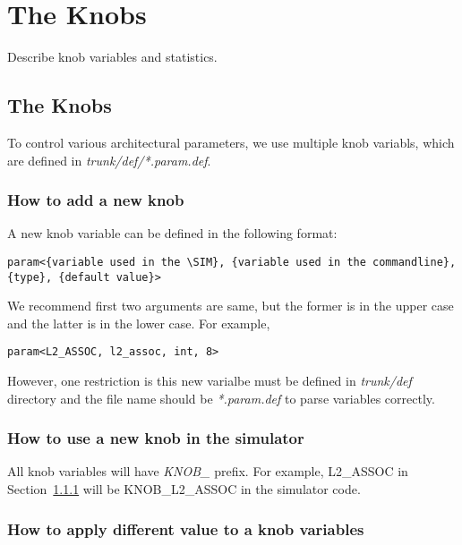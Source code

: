 
\clearpage
\section{The Knobs}


Describe knob variables and statistics.



\subsection{The Knobs}
\label{sec:knob}

To control various architectural parameters, we use multiple knob
variabls, which are defined in \textit{trunk/def/*.param.def}.

\subsubsection{How to add a new knob}
\label{sec:knob1}

A new knob variable can be defined in the following format:

\smallskip
\begin{lstlisting}
param<{variable used in the \SIM}, {variable used in the commandline}, {type}, {default value}>
\end{lstlisting}
\smallskip

We recommend first two arguments are same, but the former is in the
upper case and the latter is in the lower case. For example,

\smallskip
\begin{lstlisting}
param<L2_ASSOC, l2_assoc, int, 8>
\end{lstlisting}
\smallskip


However, one restriction is this new varialbe must be defined
in \textit{trunk/def} directory and the file name should
be \textit{*.param.def} to parse variables correctly.


\subsubsection{How to use a new knob in the simulator}

All knob variables will have \textit{KNOB\_} prefix. For example,
L2\_ASSOC in Section~\ref{sec:knob1} will be KNOB\_L2\_ASSOC in the
simulator code.


\subsubsection{How to apply different value to a knob variables}

